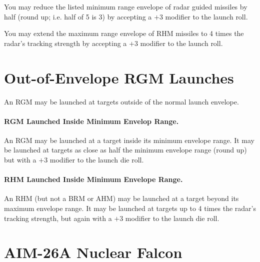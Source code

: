 \begin{advancedrules}
{You may reduce the listed minimum range envelope of radar guided missiles by half (round up; i.e. half of 5 is 3) by accepting a $+3$ modifier to the launch roll.

You may extend the maximum range envelope of RHM missiles to 4 times the radar's tracking strength by accepting a $+3$ modifier to the launch roll.

}{

\section{Out-of-Envelope RGM Launches}
\label{rule:radar-out-of-envelope-launches}

An RGM may be launched at targets outside of the normal launch envelope.

\paragraph{RGM Launched Inside Minimum Envelop Range.} An RGM may be launched at a target inside its minimum envelope range. It may be launched at targets as close as half the minimum envelope range (round up) but with a $+3$ modifier to the launch die roll.

\paragraph{RHM Launched Inside Minimum Envelope Range.} An RHM (but not a BRM or AHM) may be launched at a target beyond its maximum envelope range. It may be launched at targets up to 4 times the radar's tracking strength, but again with a $+3$ modifier to the launch die roll.

}

\section{AIM-26A Nuclear Falcon}

\end{advancedrules}
